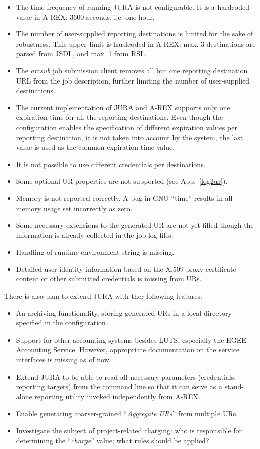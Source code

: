 \documentclass{article}                            %
\begin{document}
\begin{itemize}
\item The time frequency of running JURA is not configurable. It is a
  hardcoded value in A-REX: 3600 seconds, i.e. one hour. 
\item The number of user-supplied reporting destinations is limited
  for the sake of robustness. This upper limit is hardcoded in A-REX:
  max. 3 destinations are parsed from JSDL, and max. 1 from RSL.
\item The \textit{arcsub} job submission client removes all but one
  reporting destination URL from the job description, further limiting
  the number of user-supplied destinations.
\item The current implementation of JURA and A-REX supports only one
  expiration time for all the reporting destinations. Even though the
  configuration enables the specification of different expiration
  values per reporting destination, it is not taken into account by
  the system, the last value is used as the common expiration time
  value.
\item It is not possible to use different credentials per destinations.
\item Some optional UR properties are not supported (see
  App.~\ref{log2ur}).
\item Memory is not reported correctly. A bug in GNU ``time'' results
  in all memory usage set incorrectly as zero.
\item Some necessary extensions to the generated UR are not yet filled
  though the information is already collected in the job log files.
\item Handling of runtime environment string is missing.
\item Detailed user identity information based on the X.509 proxy
  certificate content or other submitted credentials is missing from
  URs.
\end{itemize}

There is also plan to extend JURA with ther following features:

\begin{itemize}
\item An archiving functionality, storing generated URs in a local
  directory specified in the configuration.
\item Support for other accounting systems besides LUTS, especially
  the EGEE Accounting Service. However, appropriate documentation on
  the service interfaces is missing as of now.
\item Extend JURA to be able to read all necessary parameters
  (credentials, reporting targets) from the command line so that it
  can serve as a stand-alone reporting utility invoked independently
  from A-REX.
\item Enable generating coarser-grained ``\textit{Aggregate URs}''
  from multiple URs.
\item Investigate the subject of project-related charging: who is
  responsible for determining the ``\textit{charge}'' value; what rules should
  be applied?
\end{itemize}
\end{document}
